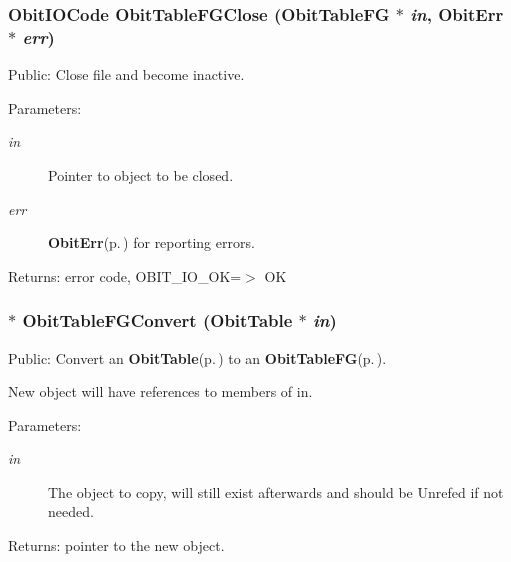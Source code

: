 \subsubsection{\setlength{\rightskip}{0pt plus 5cm}Obit\-IOCode Obit\-Table\-FGClose ({\bf Obit\-Table\-FG} $\ast$ {\em in}, {\bf Obit\-Err} $\ast$ {\em err})}\label{ObitTableFG_8c_a25}


Public: Close file and become inactive. 

\begin{Desc}
\item[Parameters:]
\begin{description}
\item[{\em in}]Pointer to object to be closed. \item[{\em err}]{\bf Obit\-Err}{\rm (p.\,\pageref{structObitErr})} for reporting errors. \end{description}
\end{Desc}
\begin{Desc}
\item[Returns:]error code, OBIT\_\-IO\_\-OK=$>$ OK \end{Desc}
\subsubsection{$\ast$ Obit\-Table\-FGConvert ({\bf Obit\-Table} $\ast$ {\em in})}\label{ObitTableFG_8c_a19}


Public: Convert an {\bf Obit\-Table}{\rm (p.\,\pageref{structObitTable})} to an {\bf Obit\-Table\-FG}{\rm (p.\,\pageref{structObitTableFG})}. 

New object will have references to members of in. \begin{Desc}
\item[Parameters:]
\begin{description}
\item[{\em in}]The object to copy, will still exist afterwards and should be Unrefed if not needed. \end{description}
\end{Desc}
\begin{Desc}
\item[Returns:]pointer to the new object. \end{Desc}
